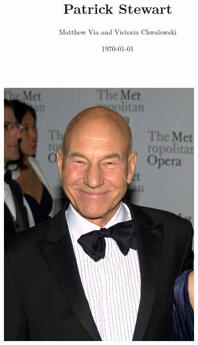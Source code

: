 \documentclass[xcolor=dvipsnames]{beamer}
\begin{document}
\author{Matthew Via and Victoria Chwalowski}
\title{Patrick Stewart}
\date{\today}
\theoremstyle{definition}
\newtheorem{fct}{Fact}
\theoremstyle{plain}
\newtheorem{qct}{Quote}
\begin{frame}{}
  \begin{columns}
    \begin{column}{0.5\textwidth}
      \titlepage
    \end{column}
    \begin{column}{0.5\textwidth}
      \begin{center}
        \includegraphics[width=0.8\textwidth]{smile.jpg}
      \end{center}
    \end{column}
  \end{columns}
\end{frame}
\end{document}
